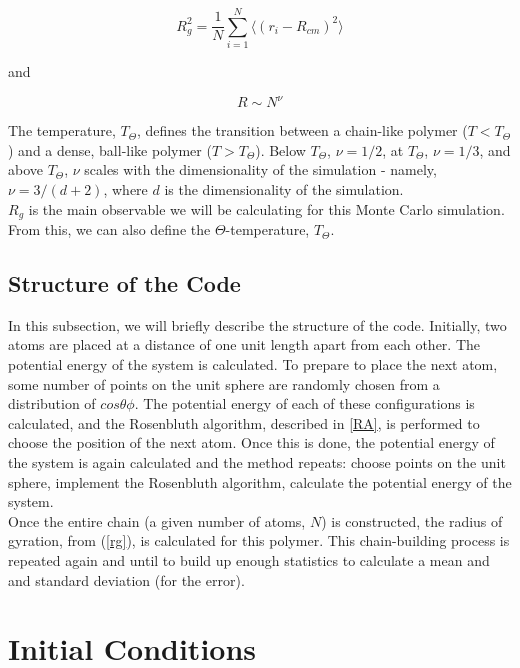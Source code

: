 \documentclass{article}
\begin{document}
\begin{multicols}{2}
\begin{equation}
\label{rg}
R_g^2 = \frac{1}{N} \sum \limits _{i=1}^{N} \langle (r_i - R_{cm})^2 \rangle
\end{equation} 

\noindent and 

\begin{equation}
\label{RNcomparison}
R \sim N^{\nu}
\end{equation}

The temperature, $T_{\Theta}$, defines the transition between a chain-like polymer ($T<T_{\Theta}$) and a dense, ball-like polymer ($T>T_{\Theta}$).  Below $T_{\Theta}$, $\nu = 1/ 2$, at $T_{\Theta}$, $\nu = 1/3$, and above $T_{\Theta}$, $\nu$ scales with the dimensionality of the simulation - namely, $\nu = 3/(d+2)$, where $d$ is the dimensionality of the simulation.  \cite{PhilNotes}\\

$R_g$ is the main observable we will be calculating for this Monte Carlo simulation.  From this, we can also define the $\Theta $-temperature, $T_{\Theta}$.

\subsection{Structure of the Code}

In this subsection, we will briefly describe the structure of the code.  Initially, two atoms are placed at a distance of one unit length apart from each other.  The potential energy of the system is calculated.  To prepare to place the next atom, some number of points on the unit sphere are randomly chosen from a distribution of $cos\theta \phi$.  The potential energy of each of these configurations is calculated, and the Rosenbluth algorithm, described in \ref{RA}, is performed to choose the position of the next atom.  Once this is done, the potential energy of the system is again calculated and the method repeats:  choose points on the unit sphere, implement the Rosenbluth algorithm, calculate the potential energy of the system.  \\

Once the entire chain (a given number of atoms, $N$) is constructed, the radius of gyration, from (\ref{rg}), is calculated for this polymer.  This chain-building process is repeated again and until to build up enough statistics to calculate a mean and and standard deviation (for the error).  

\section{Initial Conditions}
\label{IC}


\end{multicols}
\end{document}

